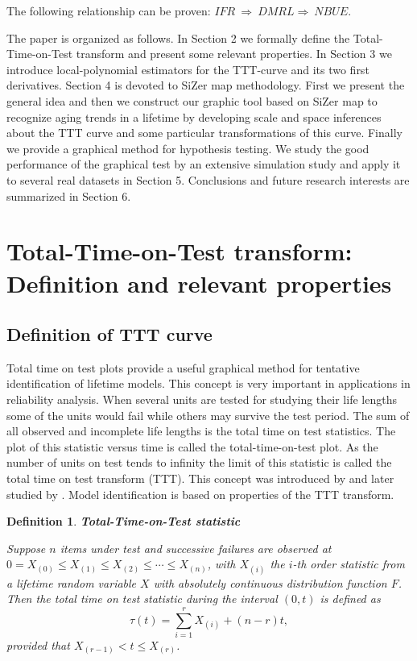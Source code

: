 \documentclass[preprint,12pt]{elsarticle}
\newtheorem{dfn}{{\sc Definition}}[section]
\begin{document}
The following relationship can be proven: $IFR \ \Rightarrow \ DMRL \Rightarrow \ NBUE$.

The paper is organized as follows. In Section 2 we formally define the Total-Time-on-Test transform and present some relevant properties. In Section 3 we introduce local-polynomial estimators for the TTT-curve and its two first derivatives. Section 4 is devoted to SiZer map methodology. First we present the general idea and then we construct our graphic tool based on SiZer map to recognize aging trends in a lifetime by developing scale and space inferences about the TTT curve and some particular transformations of this curve. Finally we provide a graphical method for hypothesis testing. We study the good performance of the graphical test by an extensive simulation study and apply it to several real datasets in Section 5. Conclusions and future research interests are summarized in Section 6. 


\bigskip

\section{Total-Time-on-Test transform: Definition and relevant properties} \label{sec:TTT}

\subsection{Definition of TTT curve}\label{sec:TTTdef}

Total time on test plots provide a useful graphical method for tentative identification of lifetime models. This concept is very important in applications in reliability analysis. When several units are tested for studying their life lengths some of the units would fail while others may survive the test period. The sum of all observed and incomplete life lengths is the total time on test statistics. The plot of this statistic versus time is called the total-time-on-test plot. As the number of units on test tends to infinity the limit of this statistic is called the total time on test transform (TTT). This concept was introduced by \cite{BD72} and later studied by \cite{BP75}.
Model identification is based on properties of the TTT transform. 

\begin{dfn} \textbf{Total-Time-on-Test statistic} \label{ttt.def1}

\noindent Suppose $n$ items under test and successive failures are observed at $0=X_{(0)} \leq X_{(1)} \leq X_{(2)}\leq \cdots \leq X_{(n)}$, with $X_{(i)}$ the $i$-th order statistic from a lifetime random variable $X$ with absolutely continuous distribution function $F$. Then the \textit{total time on test statistic} during the interval $(0,t)$ is defined as 
\[
\tau (t) = \sum_{i=1}^r X_{(i)}+\left(n-r\right)t,
\]
provided that $X_{(r-1)}<t\leq X_{(r)}$.

\end{dfn}
\end{document}
